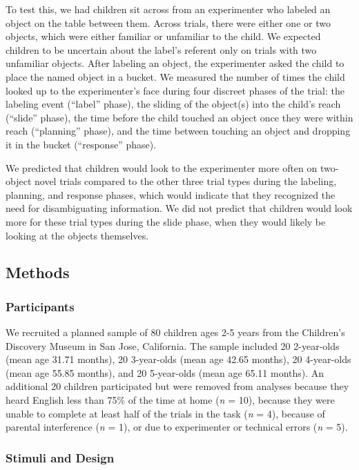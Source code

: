 \documentclass[10pt, letterpaper]{article}
\begin{document}
To test this, we had children sit across from an experimenter who
labeled an object on the table between them. Across trials, there were
either one or two objects, which were either familiar or unfamiliar to
the child. We expected children to be uncertain about the label's
referent only on trials with two unfamiliar objects. After labeling an
object, the experimenter asked the child to place the named object in a
bucket. We measured the number of times the child looked up to the
experimenter's face during four discreet phases of the trial: the
labeling event (``label'' phase), the sliding of the object(s) into the
child's reach (``slide'' phase), the time before the child touched an
object once they were within reach (``planning'' phase), and the time
between touching an object and dropping it in the bucket (``response''
phase).

We predicted that children would look to the experimenter more often on
two-object novel trials compared to the other three trial types during
the labeling, planning, and response phases, which would indicate that
they recognized the need for disambiguating information. We did not
predict that children would look more for these trial types during the
slide phase, when they would likely be looking at the objects
themselves.

\subsection{Methods}\label{methods}

\subsubsection{Participants}\label{participants}

We recruited a planned sample of 80 children ages 2-5 years from the
Children's Discovery Museum in San Jose, California. The sample included
20 2-year-olds (mean age 31.71 months), 20 3-year-olds (mean age 42.65
months), 20 4-year-olds (mean age 55.85 months), and 20 5-year-olds
(mean age 65.11 months). An additional 20 children participated but were
removed from analyses because they heard English less than 75\% of the
time at home (\emph{n} = 10), because they were unable to complete at
least half of the trials in the task (\emph{n} = 4), because of parental
interference (\emph{n} = 1), or due to experimenter or technical errors
(\emph{n} = 5).

\subsubsection{Stimuli and Design}\label{stimuli-and-design}
\end{document}
